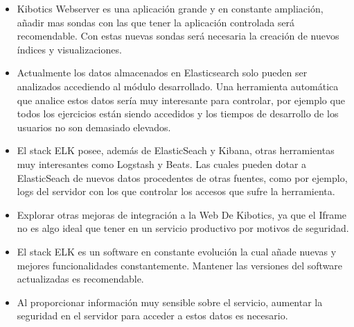 \documentclass[11pt,a4paper]{book}
\begin{document}
			\begin{itemize}
				\item Kibotics Webserver es una aplicación grande y en constante ampliación, añadir mas sondas con las que tener la aplicación controlada será recomendable. Con estas nuevas sondas será necesaria la creación de nuevos índices y visualizaciones.\\
				
				\item Actualmente los datos almacenados en Elasticsearch solo pueden ser analizados accediendo al módulo desarrollado. Una herramienta automática que analice estos datos sería muy interesante para controlar, por ejemplo que todos los ejercicios están siendo accedidos y los tiempos de desarrollo de los usuarios no son demasiado elevados.\\
				
				\item El stack ELK posee, además de ElasticSeach y Kibana, otras herramientas muy interesantes como Logstash y Beats. Las cuales pueden dotar a ElasticSeach de nuevos datos procedentes de otras fuentes, como por ejemplo, logs del servidor con los que controlar los accesos que sufre la herramienta.\\
				
				\item Explorar otras mejoras de integración a la Web De Kibotics, ya que el Iframe no es algo ideal que tener en un servicio productivo por motivos de seguridad.\\
							
				\item El stack ELK es un software en constante evolución la cual añade nuevas y mejores funcionalidades constantemente. Mantener las versiones del software actualizadas es recomendable.\\
				
				\item Al proporcionar información muy sensible sobre el servicio, aumentar la seguridad en el servidor para acceder a estos datos es necesario.\\
			\end{itemize}
	
\end{document}
